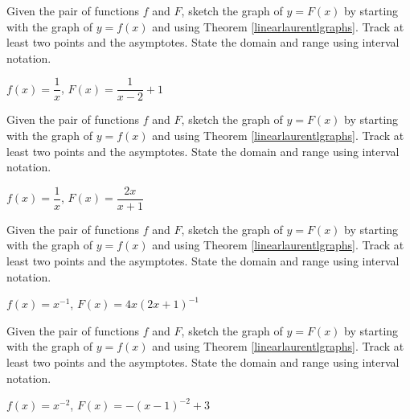 \documentclass{ximera}
\begin{document}
\begin{problem}\label{rationaltransfirst}
Given the pair of functions $f$ and $F$, sketch the graph of $y=F(x)$ by starting with the graph of $y = f(x)$ and using Theorem \ref{linearlaurentlgraphs}.  Track at least two points and the asymptotes.  State the domain and range using interval notation.

$f(x) = \dfrac{1}{x}$,  $F(x) = \dfrac{1}{x-2}+1$
\end{problem}

\begin{problem}
Given the pair of functions $f$ and $F$, sketch the graph of $y=F(x)$ by starting with the graph of $y = f(x)$ and using Theorem \ref{linearlaurentlgraphs}.  Track at least two points and the asymptotes.  State the domain and range using interval notation.

$f(x) =\dfrac{1}{x}$, $F(x) = \dfrac{2x}{x+1}$
\end{problem}

\begin{problem}
Given the pair of functions $f$ and $F$, sketch the graph of $y=F(x)$ by starting with the graph of $y = f(x)$ and using Theorem \ref{linearlaurentlgraphs}.  Track at least two points and the asymptotes.  State the domain and range using interval notation.

$f(x) =x^{-1}$, $F(x)=4x(2x+1)^{-1}$
\end{problem} 

\begin{problem}\label{rationaltranslast}
Given the pair of functions $f$ and $F$, sketch the graph of $y=F(x)$ by starting with the graph of $y = f(x)$ and using Theorem \ref{linearlaurentlgraphs}.  Track at least two points and the asymptotes.  State the domain and range using interval notation.

$f(x) = x^{-2}$, $F(x)=-(x-1)^{-2}+3$ 
\end{problem}   
\end{document}
